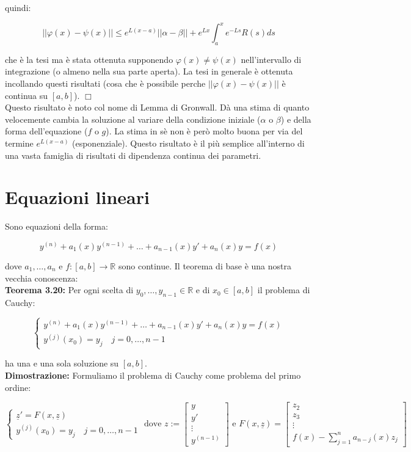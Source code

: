 \documentclass[a4paper,11pt,titlepage]{book}
\begin{document}
quindi:

$$||\varphi(x)-\psi(x)||\leq e^{L(x-a)}||\alpha-\beta||+e^{Lx}\int_a^x e^{-Ls}R(s)ds$$

che è la tesi ma è stata ottenuta supponendo $\varphi(x)\ne\psi(x)$ nell'intervallo di integrazione (o almeno nella sua parte aperta). La tesi in generale è ottenuta incollando questi risultati (cosa che è possibile perche $||\varphi(x)-\psi(x)||$ è continua su $[a,b]$). $\Box$\\

Questo risultato è noto col nome di Lemma di Gronwall. Dà una stima di quanto velocemente cambia la soluzione al variare della condizione iniziale ($\alpha$ o $\beta$) e della forma dell'equazione ($f$ o $g$). La stima in sè non è però molto buona per via del termine $e^{L(x-a)}$ (esponenziale). Questo risultato è il più semplice all'interno di una vasta famiglia di risultati di dipendenza continua dei parametri.\\

\section{Equazioni lineari}

Sono equazioni della forma:

$$y^{(n)}+a_1(x)y^{(n-1)}+\ldots+a_{n-1}(x)y'+a_n(x)y=f(x)$$

dove $a_1,\ldots,a_n$ e $f:[a,b]\to\mathbb{R}$ sono continue. Il teorema di base è una nostra vecchia conoscenza:\\

\textbf{Teorema 3.20:} Per ogni scelta di $y_0,\ldots,y_{n-1}\in\mathbb{R}$ e di $x_0\in[a,b]$ il problema di Cauchy:

$$\begin{cases}
y^{(n)}+a_1(x)y^{(n-1)}+\ldots+a_{n-1}(x)y'+a_n(x)y=f(x)\\
y^{(j)}(x_0)=y_j\quad j=0,\ldots,n-1
\end{cases}$$

ha una e una sola soluzione su $[a,b]$.\\

\textbf{Dimostrazione:} Formuliamo il problema di Cauchy come problema del primo ordine:

$$\begin{cases}
\underline{z}'=F(x,\underline{z})\\
y^{(j)}(x_0)=y_j\quad j=0,\ldots,n-1
\end{cases}\mbox{ dove } z:= \begin{bmatrix} y\\y'\\ \vdots \\ y^{(n-1)} \end{bmatrix}\mbox{ e } F(x,\underline{z})= \begin{bmatrix} z_2 \\ z_3 \\ \vdots \\ f(x)-\sum_{j=1}^n a_{n-j}(x)z_j \end{bmatrix}$$
\end{document}
